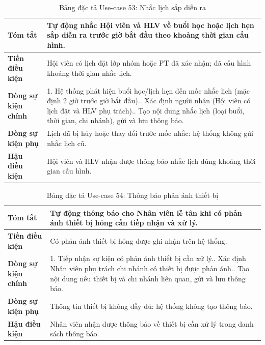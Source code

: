 \documentclass[a4paper,12pt]{article}
\begin{document}
\begin{table}[H]\centering\footnotesize
\begin{tabularx}{\textwidth}{|L{3.2cm}|Y|}
\hline \textbf{Tóm tắt} & Tự động nhắc Hội viên và HLV về buổi học hoặc lịch hẹn sắp diễn ra trước giờ bắt đầu theo khoảng thời gian cấu hình. \\ \hline
\textbf{Tiền điều kiện} & Hội viên có lịch đặt lớp nhóm hoặc PT đã xác nhận; đã cấu hình khoảng thời gian nhắc lịch. \\ \hline
\textbf{Dòng sự kiện chính} & 1. Hệ thống phát hiện buổi học/lịch hẹn đến mốc nhắc lịch (mặc định 2 giờ trước giờ bắt đầu).. Xác định người nhận (Hội viên có lịch đặt và HLV phụ trách).. Tạo nội dung nhắc lịch (loại buổi, thời gian, chi nhánh), gửi và lưu thông báo. \\ \hline
\textbf{Dòng sự kiện phụ} & Lịch đã bị hủy hoặc thay đổi trước mốc nhắc: hệ thống không gửi nhắc lịch cũ. \\ \hline
\textbf{Hậu điều kiện} & Hội viên và HLV nhận được thông báo nhắc lịch đúng khoảng thời gian cấu hình. \\ \hline
\end{tabularx}
\caption{Bảng đặc tả Use-case 53: Nhắc lịch sắp diễn ra}
\end{table}

\begin{table}[H]\centering\footnotesize
\begin{tabularx}{\textwidth}{|L{3.2cm}|Y|}
\hline \textbf{Tóm tắt} & Tự động thông báo cho Nhân viên lễ tân khi có phản ánh thiết bị hỏng cần tiếp nhận và xử lý. \\ \hline
\textbf{Tiền điều kiện} & Có phản ánh thiết bị hỏng được ghi nhận trên hệ thống. \\ \hline
\textbf{Dòng sự kiện chính} & 1. Tiếp nhận sự kiện có phản ánh thiết bị cần xử lý.. Xác định Nhân viên phụ trách chi nhánh có thiết bị được phản ánh.. Tạo nội dung nêu thiết bị và chi nhánh liên quan, gửi và lưu thông báo. \\ \hline
\textbf{Dòng sự kiện phụ} & Thông tin thiết bị không đầy đủ: hệ thống không tạo thông báo. \\ \hline
\textbf{Hậu điều kiện} & Nhân viên nhận được thông báo về thiết bị cần xử lý trong danh sách thông báo. \\ \hline
\end{tabularx}
\caption{Bảng đặc tả Use-case 54: Thông báo phản ánh thiết bị}
\end{table}
\end{document}
